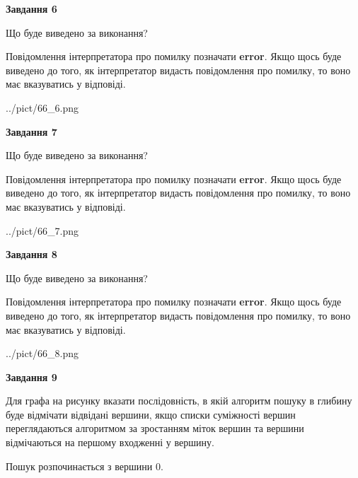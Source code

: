 \documentclass[12pt, ukrainian]{article}
\begin{document}
{\begin {large}
{\begin {center}\textbf{Завдання 6}\end {center}}\par
Що буде виведено за виконання?

Повідомлення інтерпретатора про помилку позначати \textbf{error}.
Якщо щось буде виведено до того, як інтерпретатор видасть повідомлення про помилку, 
то воно має вказуватись у відповіді. \par


\begin{center}
	{../pict/66_6.png}
\end{center}
\newpage

{\begin {center}\textbf{Завдання 7}\end {center}}\par
Що буде виведено за виконання?

Повідомлення інтерпретатора про помилку позначати \textbf{error}.
Якщо щось буде виведено до того, як інтерпретатор видасть повідомлення про помилку, 
то воно має вказуватись у відповіді. \par


\begin{center}
	{../pict/66_7.png}
\end{center}
\newpage

{\begin {center}\textbf{Завдання 8}\end {center}}\par
Що буде виведено за виконання?

Повідомлення інтерпретатора про помилку позначати \textbf{error}.
Якщо щось буде виведено до того, як інтерпретатор видасть повідомлення про помилку, 
то воно має вказуватись у відповіді. \par


\begin{center}
	{../pict/66_8.png}
\end{center}
\newpage

{\begin {center}\textbf{Завдання 9}\end {center}}\par
Для графа на рисунку вказати послідовність, в якій алгоритм пошуку в глибину буде відмічати відвідані вершини, якщо списки суміжності вершин переглядаються алгоритмом за зростанням міток вершин та вершини відмічаються на першому вход\-женні у вершину.\par
Пошук розпочинається з вершини 0.\par


\end{large}}
\end{document}
